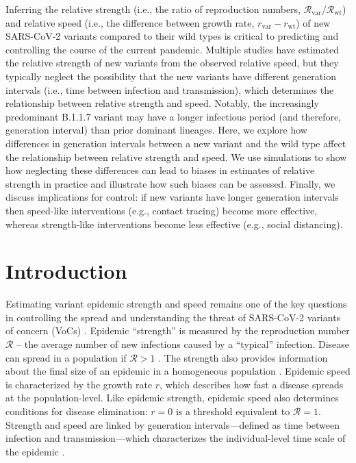 \documentclass[12pt]{article}
\newcommand{\vvvar}{\mathrm{var}}
\newcommand{\wwwt}{\mathrm{wt}}
\newcommand{\rx}[1]{\ensuremath{{r}_{#1}}\xspace}
\newcommand{\rw}{\rx{\wwwt}}
\newcommand{\rv}{\rx{\vvvar}}
\newcommand{\Rx}[1]{\ensuremath{{\mathcal R}_{#1}}\xspace}
\newcommand{\RR}{\ensuremath{{\mathcal R}}\xspace}
\newcommand{\Rw}{\Rx{\wwwt}}
\newcommand{\Rv}{\Rx{\vvvar}}
\begin{document}
Inferring the relative strength (i.e., the ratio of reproduction numbers, $\Rv/\Rw$) and relative speed (i.e., the difference between growth rate, $\rv-\rw$) of new SARS-CoV-2 variants compared to their wild types is critical to predicting and controlling the course of the current pandemic.
Multiple studies have estimated the relative strength of new variants from the observed relative speed, but they typically neglect the possibility that the new variants have different generation intervals (i.e., time between infection and transmission), which determines the relationship between relative strength and speed.
Notably, the increasingly predominant B.1.1.7 variant may have a longer infectious period (and therefore, generation interval) than prior dominant lineages.
Here, we explore how differences in generation intervals between a new variant and the wild type affect the relationship between relative strength and speed.
We use simulations to show how neglecting these differences can lead to biases in estimates of relative strength  in practice and illustrate how such biases can be assessed.
Finally, we discuss implications for control: if new variants have longer generation intervals then speed-like interventions (e.g., contact tracing) become more effective, whereas strength-like interventions become less effective (e.g., social distancing).

\section{Introduction}

Estimating variant epidemic strength and speed remains one of the key questions in controlling the spread and understanding the threat of SARS-CoV-2 variants of concern (VoCs) \citep{switzerland2021variant, davies2021estimated, di2021impact, leung2021early, volz2021transmission,zhao2021}.
Epidemic ``strength'' is measured by the reproduction number $\RR$ -- the average number of new infections caused by a ``typical'' infection. 
Disease can spread in a population if $\RR>1$ \citep{diekmann1990definition}.
The strength also provides information about the final size of an epidemic in a homogeneous population \citep{anderson1991infectious}.
Epidemic speed is characterized by the growth rate $r$, which describes how fast a disease spreads at the population-level.
Like epidemic strength, epidemic speed also determines conditions for disease elimination: $r=0$ is a threshold equivalent to $\RR=1$.
Strength and speed are linked by generation intervals---defined as time between infection and transmission---which characterizes the individual-level time scale of the epidemic \citep{roberts2007model,svensson2007note,wallinga2007generation}.
\end{document}
